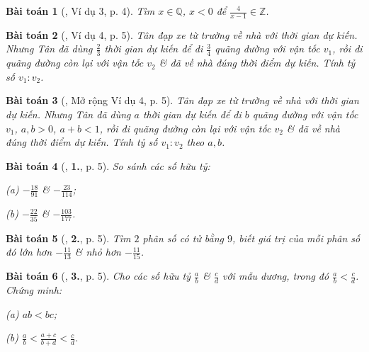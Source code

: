 \documentclass{article}
\numberwithin{equation}{section}
\newtheorem{baitoan}{Bài toán}[section]
\begin{document}
\begin{baitoan}[\cite{Binh_Toan_7_tap_1}, Ví dụ 3, p. 4]
	Tìm $x\in\mathbb{Q}$, $x < 0$ để $\frac{4}{x - 1}\in\mathbb{Z}$.
\end{baitoan}

\begin{baitoan}[\cite{Binh_Toan_7_tap_1}, Ví dụ 4, p. 5]
	Tân đạp xe từ trường về nhà với thời gian dự kiến. Nhưng Tân đã dùng $\frac{2}{3}$ thời gian dự kiến để đi $\frac{3}{4}$ quãng đường với vận tốc $v_1$, rồi đi quãng đường còn lại với vận tốc $v_2$ \& đã về nhà đúng thời điểm dự kiến. Tính tỷ số $v_1:v_2$.
\end{baitoan}

\begin{baitoan}[\cite{Binh_Toan_7_tap_1}, Mở rộng Ví dụ 4, p. 5]
	Tân đạp xe từ trường về nhà với thời gian dự kiến. Nhưng Tân đã dùng $a$ thời gian dự kiến để đi $b$ quãng đường với vận tốc $v_1$, $a,b > 0$, $a + b < 1$, rồi đi quãng đường còn lại với vận tốc $v_2$ \& đã về nhà đúng thời điểm dự kiến. Tính tỷ số $v_1:v_2$ theo $a,b$.
\end{baitoan}

\begin{baitoan}[\cite{Binh_Toan_7_tap_1}, \textbf{1.}, p. 5]
	So sánh các số hữu tỷ:
	\begin{enumerate*}
		\item[(a)] $-\frac{18}{91}$ \& $-\frac{23}{114}$;
		\item[(b)] $-\frac{22}{35}$ \& $-\frac{103}{177}$.
	\end{enumerate*}
\end{baitoan}

\begin{baitoan}[\cite{Binh_Toan_7_tap_1}, \textbf{2.}, p. 5]
	Tìm $2$ phân số có tử bằng $9$, biết giá trị của mỗi phân số đó lớn hơn $-\frac{11}{13}$ \& nhỏ hơn $-\frac{11}{15}$.
\end{baitoan}

\begin{baitoan}[\cite{Binh_Toan_7_tap_1}, \textbf{3.}, p. 5]
	Cho các số hữu tỷ $\frac{a}{b}$ \& $\frac{c}{d}$ với mẫu dương, trong đó $\frac{a}{b} < \frac{c}{d}$. Chứng minh:
	\begin{enumerate*}
		\item[(a)] $ab < bc$;
		\item[(b)] $\frac{a}{b} < \frac{a + c}{b + d} < \frac{c}{d}$.
	\end{enumerate*}
\end{baitoan}
\end{document}
